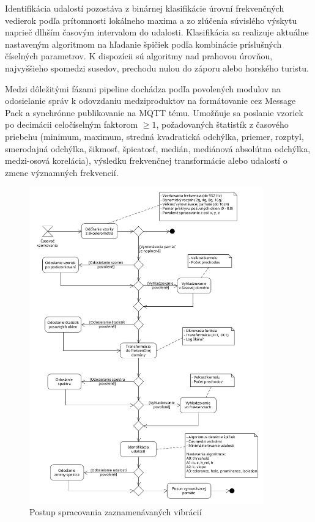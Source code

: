 Identifikácia udalostí pozostáva z binárnej klasifikácie úrovní frekvenčných vedierok podľa prítomnosti lokálneho maxima a
zo zlúčenia súvislého výskytu naprieč dlhším časovým intervalom do udalosti. Klasifikácia sa realizuje 
aktuálne nastaveným algoritmom na hľadanie špičiek podľa kombinácie príslušných číselných parametrov. K dispozícii sú
algoritmy nad prahovou úrovňou, najvyššieho spomedzi susedov, prechodu nulou do záporu alebo horského turistu.

Medzi dôležitými fázami pipeline dochádza podľa povolených modulov na odosielanie správ k odovzdaniu medziproduktov na formátovanie
cez Message Pack a synchrónne publikovanie na MQTT tému. Umožňuje sa poslanie vzoriek po decimácii celočíselným faktorom $\geq 1$, 
požadovaných štatistík z časového priebehu (minimum, maximum, stredná kvadratická odchýlka, priemer, rozptyl, smerodajná odchýlka,
šikmosť, špicatosť, medián, mediánová absolútna odchýlka, medzi-osová korelácia), výsledku frekvenčnej transformácie alebo udalostí 
o zmene významných frekvencií.

\begin{figure}[h]
	\centering
	\includegraphics[width=0.9\textwidth]{figures/design/pipeline.png}
	\caption{Postup spracovania zaznamenávaných vibrácií}
	\label{pipeline}
\end{figure}

